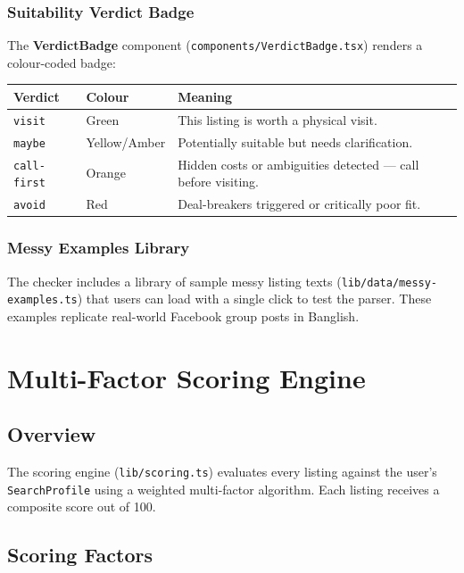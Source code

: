 \documentclass[12pt, a4paper, oneside]{report}
\newcommand{\filepath}[1]{\texttt{\small\color{codeblue}#1}}
\newcommand{\component}[1]{\textbf{\color{darkbg}#1}}
\newcommand{\typename}[1]{\texttt{\small\color{codeblue}#1}}
\begin{document}
\subsection{Suitability Verdict Badge}

The \component{VerdictBadge} component (\filepath{components/VerdictBadge.tsx}) renders a colour-coded badge:

\begin{longtable}{p{3cm} p{3cm} p{7cm}}
\toprule
\textbf{Verdict} & \textbf{Colour} & \textbf{Meaning} \\
\midrule
\endhead
\texttt{visit} & Green & This listing is worth a physical visit. \\
\texttt{maybe} & Yellow/Amber & Potentially suitable but needs clarification. \\
\texttt{call-first} & Orange & Hidden costs or ambiguities detected --- call before visiting. \\
\texttt{avoid} & Red & Deal-breakers triggered or critically poor fit. \\
\bottomrule
\end{longtable}

\subsection{Messy Examples Library}

The checker includes a library of sample messy listing texts (\filepath{lib/data/messy-examples.ts}) that users can load with a single click to test the parser. These examples replicate real-world Facebook group posts in Banglish.


\chapter{Multi-Factor Scoring Engine}

\section{Overview}

The scoring engine (\filepath{lib/scoring.ts}) evaluates every listing against the user's \typename{SearchProfile} using a weighted multi-factor algorithm. Each listing receives a composite score out of 100.

\section{Scoring Factors}
\end{document}
